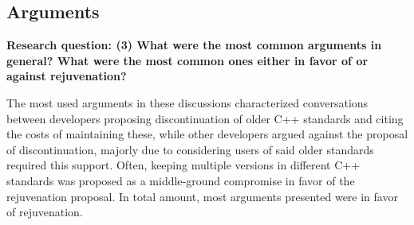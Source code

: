 \documentclass[12pt]{article}
\begin{document}
\subsection{Arguments}

\textbf{Research question: (3) What were the most common arguments in general? What were the most common ones either in favor of or against rejuvenation?}

The most used arguments in these discussions characterized conversations between developers proposing discontinuation of older C++ standards and citing the costs of maintaining these, while other developers argued against the proposal of discontinuation, majorly due to considering users of said older standards required this support. Often, keeping multiple versions in different C++ standards was proposed as a middle-ground compromise in favor of the rejuvenation proposal. In total amount, most arguments presented were in favor of rejuvenation.




\end{document}
